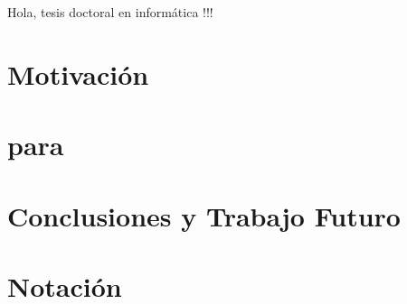 \documentclass[utf8,11pt]{book}
\begin{document}



Hola, tesis doctoral en informática !!!
\newpage

%


%
\tableofcontents

\chapter*{Motivación}
\label{chap:motivacion}





\chapter{\srw}
\label{chap:SRW}





\chapter{\arm}
\label{chap:arm}





\chapter{\ARM para \Clasificacion}
\label{chap:clasificacion}





\chapter{Conclusiones y Trabajo Futuro}
\label{chap:conclusiones-y-trabajo-futuro}




\appendix
\chapter{Notación}
\label{apdx:notacion}

\end{document}
